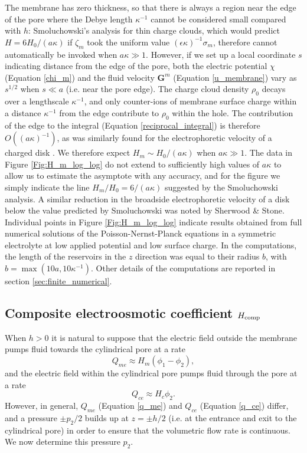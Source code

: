 The membrane has zero thickness, so that there is always a region near
the edge of the pore where the Debye length $\kappa^{-1}$ cannot be
considered small compared with $h$:
Smoluchowski's analysis for thin charge
clouds, which would predict $H=6H_0/(a\kappa)$ if $\zeta_m$ took the
uniform value $(\epsilon\kappa)^{-1}\sigma_m$,
therefore cannot automatically be invoked when $a\kappa\gg 1$.
However, if we set up a local coordinate $s$ indicating distance from
the edge of the pore, both the electric potential $\chi$ (Equation \ref{chi_m})
and the fluid velocity $\mathbf{G}^m$ (Equation \ref{u_membrane})
vary as $s^{1/2}$ when $s\ll a$ (i.e. near the pore edge).
The charge cloud density $\rho_0$ decays over a lengthscale $\kappa^{-1}$,
and only counter-ions of membrane surface charge within a distance $\kappa^{-1}$
from the edge contribute to $\rho_0$ within the hole. The contribution
of the edge to the integral (Equation \ref{reciprocal_integral})
is therefore $O((a\kappa)^{-1})$,
as was similarly found for the electrophoretic velocity of a charged disk \cite{Sherwood1995}.
We therefore expect
$H_m\sim H_0/(a\kappa)$ when $a\kappa\gg 1$. The data in
Figure \ref{Fig:H_m_log_log} do not extend to sufficiently high
values of $a\kappa$ to allow us to estimate the asymptote with
any accuracy, and for the figure we simply indicate the line
$H_m/H_0=6/(a\kappa)$ suggested by the Smoluchowski analysis.
A similar reduction in the broadside electrophoretic velocity of a disk
below the value predicted by Smoluchowski was
noted by Sherwood \& Stone. \cite{Sherwood1995}
Individual points in Figure \ref{Fig:H_m_log_log}
indicate results obtained from full numerical solutions of
the Poisson-Nernst-Planck equations in a symmetric electrolyte
at low applied potential and low surface charge. 
In the computations, the length of
the reservoirs in the $z$ direction was equal to their
radius $b$, with $b=\max(10a,10\kappa^{-1})$.
Other details of the computations are reported in section \ref{sec:finite_numerical}.

\subsection{Composite electroosmotic coefficient $H_{\rm comp}$}
\label{subsec:finite_composite2}
When $h>0$ it is natural to suppose that the electric field
outside
the membrane pumps fluid towards the cylindrical pore at a rate
\begin{equation}
Q_{me}\approx H_m(\phi_1-\phi_2),
\label{q_me}
\end{equation}
and the electric field within the cylindrical pore
pumps fluid through the pore at a rate
\begin{equation}
Q_{ce}\approx H_c\phi_2.
\label{q_ce}
\end{equation}
However, in general, $Q_{me}$ (Equation \ref{q_me}) and
$Q_{ce}$ (Equation \ref{q_ce}) differ, and a pressure $\pm p_2/2$ builds
up at $z=\pm h/2$ (i.e. at the entrance and exit to the cylindrical pore)
in order to ensure that the volumetric flow rate is
continuous. We now determine this pressure $p_2$.

